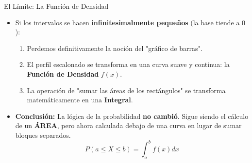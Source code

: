 \documentclass[11pt, aspectratio=169]{beamer}
\begin{document}
\begin{frame}{El Límite: La Función de Densidad}
    \begin{itemize}
        \item Si los intervalos se hacen \textbf{infinitesimalmente pequeños} (la base tiende a $0$):
        \begin{enumerate}
            \item Perdemos definitivamente la noción del "gráfico de barras". 
            \item El perfil escalonado se transforma en una curva suave y continua: la \textbf{Función de Densidad} $f(x)$.
            \item La operación de "sumar las áreas de los rectángulos" se transforma matemáticamente en una \textbf{Integral}.
        \end{enumerate}
        \item \textbf{Conclusión:} La lógica de la probabilidad \textbf{no cambió}. Sigue siendo el cálculo de un \textbf{ÁREA}, pero ahora calculada debajo de una curva en lugar de sumar bloques separados.
        \begin{equation*}
            P(a \le X \le b) = \int_{a}^{b} f(x) dx
        \end{equation*}
    \end{itemize}
\end{frame}
\end{document}
